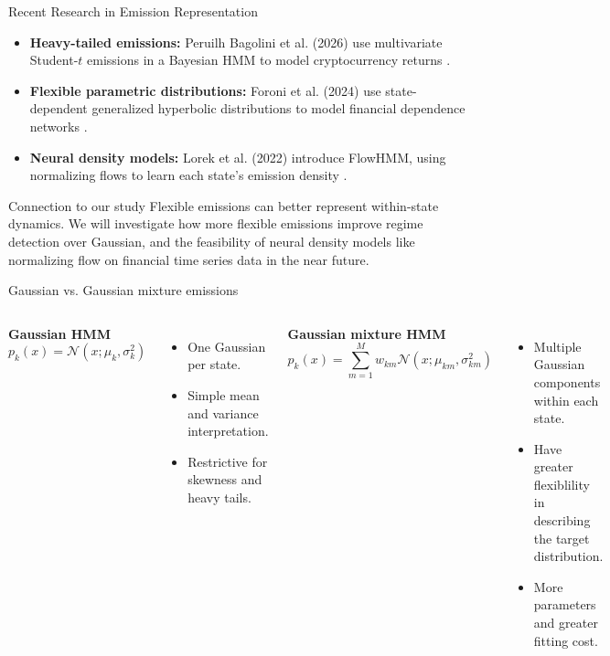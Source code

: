 \begin{frame}{Recent Research in Emission Representation}

\begin{itemize}
    \item \textbf{Heavy-tailed emissions:}
    Peruilh Bagolini et al. (2026) use multivariate Student-$t$
    emissions in a Bayesian HMM to model cryptocurrency returns \cite{bagolini2026}. 

    \item \textbf{Flexible parametric distributions:}
    Foroni et al. (2024) use state-dependent generalized
    hyperbolic distributions to model financial dependence
    networks \cite{foroni2024}.

    \item \textbf{Neural density models:}
    Lorek et al. (2022) introduce FlowHMM, using normalizing flows to learn each state's emission density \cite{lorek2022}.
\end{itemize}

\begin{alertblock}{Connection to our study}
Flexible emissions can better represent within-state dynamics. We will investigate how more flexible emissions improve regime detection over Gaussian, and the feasibility of neural density models like normalizing flow on financial time series data in the near future.
\end{alertblock}

\end{frame}

\begin{frame}{Gaussian vs. Gaussian mixture emissions}
\small
\begin{columns}[T,onlytextwidth]
\textbf{Gaussian HMM}
\[
p_k(x)=\mathcal N(x;\mu_k,\sigma_k^2)
\]
\begin{itemize}
\item One Gaussian per state.
\item Simple mean and variance interpretation.
\item Restrictive for skewness and heavy tails.
\end{itemize}
\textbf{Gaussian mixture HMM}
\[
p_k(x)=\sum_{m=1}^{M}w_{km}\mathcal N(x;\mu_{km},\sigma_{km}^2)
\]
\begin{itemize}
\item Multiple Gaussian components within each state.
\item Have greater flexiblility in describing the target distribution.
\item More parameters and greater fitting cost.
\end{itemize}
\end{columns}
\vspace{0.3cm}

\end{frame}

